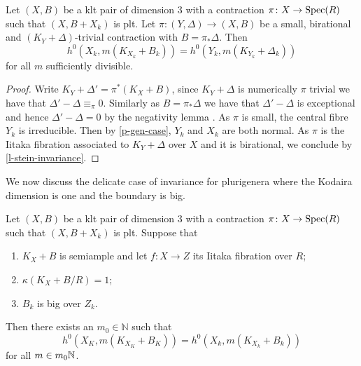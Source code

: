 	\begin{lemma}\label{l-reduce-Q-fac}
		Let $(X,B)$ be a klt pair of dimension $3$ with a contraction $\pi \colon X \to \operatorname{Spec}(R)$ such that $(X,B+X_{k})$ is plt.
		Let $\pi\colon (Y,\Delta) \to (X,B)$ be a small, birational and $(K_{Y}+\Delta)$-trivial contraction with $B=\pi_{*}\Delta$. 
		Then
		$$h^{0}(X_{k},m(K_{X_k}+B_{k}))= h^{0}(Y_{k},m(K_{Y_{k}}+\Delta_{k}))$$ 
		for all $m$ sufficiently divisible. 
	\end{lemma}

	\begin{proof}
		Write $K_Y+\Delta'=\pi^* (K_X+B)$, since $K_{Y}+\Delta$ is numerically $\pi$ trivial we have that $\Delta'-\Delta \equiv_{\pi} 0$. Similarly as $B=\pi_{*}\Delta$ we have that $\Delta'-\Delta$ is exceptional and hence $\Delta'-\Delta=0$ by the negativity lemma \cite[Lemma 2.14]{bhatt2020}. As $\pi$ is small, the central fibre $Y_k$ is irreducible. 
		Then by \autoref{p-gen-case}, $Y_k$ and $X_k$ are both normal.
		As $\pi$ is the Iitaka fibration associated to $K_Y+\Delta$ over $X$ and it is birational, we conclude by \autoref{l-stein-invariance}.
	\end{proof}
	
	We now discuss the delicate case of invariance for plurigenera where the Kodaira dimension is one and the boundary is big.
	
	
	\begin{proposition}\label{p-1-case}
		
		Let $(X,B)$ be a klt pair of dimension $3$ with a contraction $\pi \colon X \to \operatorname{Spec}(R)$ such that $(X,B+X_{k})$ is plt. Suppose that
		\begin{enumerate}
			\item $K_X+B$ is semiample and let $f\colon X \to Z$ its Iitaka fibration over $R$;
			\item $\kappa(K_X+B/R)=1$;
			\item $B_{k}$ is big over $Z_{k}$.
		\end{enumerate}
		Then there exists an $m_{0} \in \mathbb{N}$  such that 
		$$h^0(X_K,m(K_{X_K}+B_K))=h^0(X_k,m(K_{X_k}+B_k))$$
		for all $m\in m_0\mathbb{N}$.	
	\end{proposition}
	

